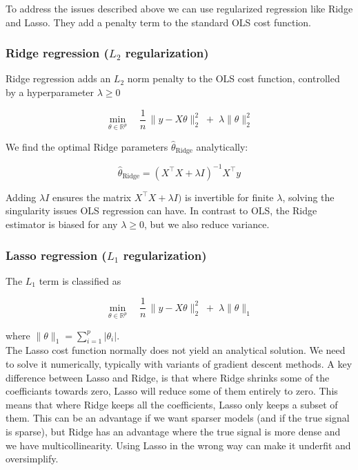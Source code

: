 \documentclass[amssymb,twocolumn,aps]{revtex4-2}
\begin{document}
To address the issues described above we can use regularized regression like Ridge and Lasso. They add a penalty term to the standard OLS cost function. \\

\subsubsection{Ridge regression ($L_2$ regularization)}
\label{subsubsec:rdg_theory}

Ridge regression adds an $L_2$ norm penalty to the OLS cost function, controlled by a hyperparameter $\lambda \ge 0$

\begin{equation}
\min_{\theta \in \mathbb{R}^p}
\quad
\frac{1}{n}\,\lVert y - X\theta \rVert_2^2
\;+\;
\lambda \lVert \theta \rVert_2^2
\end{equation}

We find the optimal Ridge parameters $\hat{\theta}_{\text{Ridge}}$ analytically: 

\begin{equation}
    \hat{\theta}_{\text{Ridge}}
= (X^\top X + \lambda I)^{-1} X^\top y
\end{equation}

Adding $\lambda I$ ensures the matrix $X^\top X + \lambda I)$ is invertible for finite $\lambda$, solving the singularity issues OLS regression can have. In contrast to OLS, the Ridge estimator is biased for any $\lambda \ge 0$, but we also reduce variance. \\

\subsubsection{Lasso regression ($L_1$ regularization)}
\label{subsubsec:lasso_theory}

The $L_1$ term is classified as 

\begin{equation}
\min_{\theta \in \mathbb{R}^p}
\quad
\frac{1}{n}\,\lVert y - X\theta \rVert_2^2
\;+\;
\lambda \lVert \theta \rVert_1
\end{equation}

where $\lVert \theta \rVert_1 = \sum_{i=1}^p \lvert \theta_i \rvert$. \\

The Lasso cost function normally does not yield an analytical solution. We need to solve it numerically, typically with variants of gradient descent methods. A key difference between Lasso and Ridge, is that where Ridge shrinks some of the coefficiants towards zero, Lasso will reduce some of them entirely to zero. This means that where Ridge keeps all the coefficients, Lasso only keeps a subset of them. This can be an advantage if we want sparser models (and if the true signal is sparse), but Ridge has an advantage where the true signal is more dense and we have multicollinearity. Using Lasso in the wrong way can make it underfit and oversimplify. 
\end{document}
